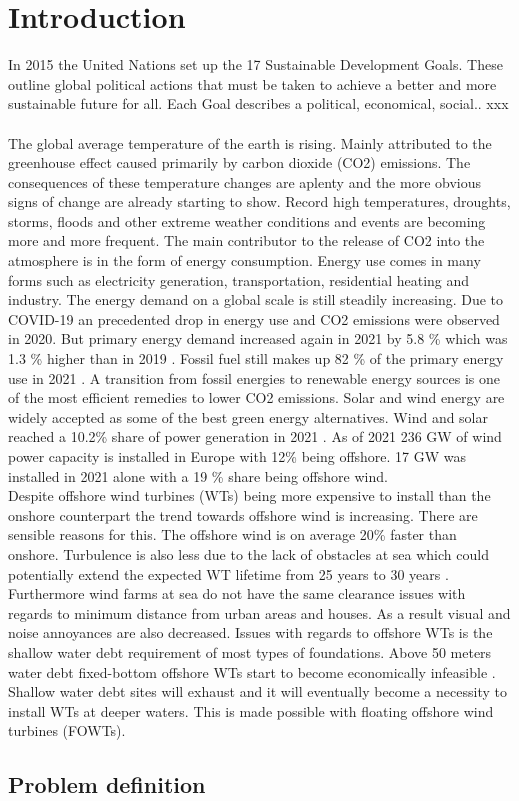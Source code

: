 \section{Introduction} \label{sec:intro}
In 2015 the United Nations set up the 17 Sustainable Development Goals. These outline global political actions that must be taken to achieve a better and more sustainable future for all. Each Goal describes a political, economical, social.. xxx \\ \\


The global average temperature of the earth is rising. Mainly attributed to the greenhouse effect caused primarily by carbon dioxide (CO2) emissions. The consequences of these temperature changes are aplenty and the more obvious signs of change are already starting to show. Record high temperatures, droughts, storms, floods and other extreme weather conditions and events are becoming more and more frequent. The main contributor to the release of CO2 into the atmosphere is in the form of energy consumption. Energy use comes in many forms such as electricity generation, transportation, residential heating and industry. The energy demand on a global scale is still steadily increasing. Due to COVID-19 an precedented drop in energy use and CO2 emissions were observed in 2020. But primary energy demand increased again in 2021 by 5.8 \% which was 1.3 \% higher than in 2019 \cite{bp2022}. Fossil fuel still makes up 82 \% of the primary energy use in 2021 \cite{bp2022}. A transition from fossil energies to renewable energy sources is one of the most efficient remedies to lower CO2 emissions. Solar and wind energy are widely accepted as some of the best green energy alternatives. Wind and solar reached a 10.2\% share of power generation in 2021 \cite{bp2022}. As of 2021 236 GW of wind power capacity is installed in Europe with 12\% being offshore. 17 GW was installed in 2021 alone with a 19 \% share being offshore wind\cite{Sesto1992}. \\

Despite offshore wind turbines (WTs) being more expensive to install than the onshore counterpart the trend towards offshore wind is increasing. There are sensible reasons for this. The offshore wind is on average 20\% faster than onshore. Turbulence is also less due to the lack of obstacles at sea which could potentially extend the expected WT lifetime from 25 years to 30 years \cite{Christiansen2013}. Furthermore wind farms at sea do not have the same clearance issues with regards to minimum distance from urban areas and houses. As a result visual and noise annoyances are also decreased. Issues with regards to offshore WTs is the shallow water debt requirement of most types of foundations. Above 50 meters water debt fixed-bottom offshore WTs start to become economically infeasible \cite{Lefebvre2012}. Shallow water debt sites will exhaust and it will eventually become a necessity to install WTs at deeper waters. This is made possible with floating offshore wind turbines (FOWTs).


\subsection{Problem definition}
